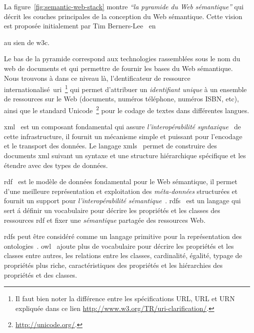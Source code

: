 La figure~\ref{fig:semantic-web-stack} montre \emph{``la pyramide du
  Web sémantique''} qui décrit les couches principales de la
conception du Web sémantique. Cette vision est proposée initialement
par Tim Berners-Lee~\cite{berners2000xml} en \date{2000} au sien de
\acrshort{w3c}.\medskip

Le bas de la pyramide correspond aux technologies rassemblées sous le
nom du web de documents et qui permettre de fournir les bases du Web
sémantique. Nous trouvons à dans ce niveau là, l'dentificateur de
ressource internationalisé~\acrshort{uri}~\footnote{Il faut bien noter
  la différence entre les spécifications URL, URL et URN expliquée
  dans ce lien \url{http://www.w3.org/TR/uri-clarification/}.} qui
permet d'attribuer un \emph{identifiant unique} à un ensemble de
ressources sur le Web (documents, numéros téléphone, numéros ISBN,
etc), ainsi que le standard
\textsf{Unicode}~\footnote{\url{http://unicode.org/}.}  pour le codage
de textes dans différentes langues.\medskip

\acrshort{xml}~\cite{bray1998extensible} est un composant fondamental
qui assure \emph{l'interopérabilité
  syntaxique}~\cite{decker2000semantic} de cette infrastructure, il
fournit un mécanisme simple et puissant pour l'encodage et le
transport des données. Le langage
\acrshort{xmls}~\cite{fallside2004xml} permet de construire des
documents \acrshort{xml} suivant un syntaxe et une structure
hiérarchique spécifique et les étendre avec des types de
données.\medskip

\acrshort{rdf}~\cite{lassila1999resource} est le modèle de données
fondamental pour le Web sémantique, il permet d'une meilleure
représentation et exploitation des \emph{méta-données} structurées et
fournit un support pour \emph{l'interopérabilité
  sémantique}~\cite{decker2000semantic}. \acrshort{rdfs}~\cite{brickley2000resource}
est un langage qui sert á définir un vocabulaire pour décrire les
propriétés et les classes des ressources \acrshort{rdf} et fixer une
\emph{sémantique} partagée des ressources Web.\medskip

\acrshort{rdfs} peut être considéré comme un langage primitive pour la
représentation des
ontologies~\cite{antoniou2012semantic}. \acrshort{owl}~\cite{martin2004owl}
ajoute plus de vocabulaire pour décrire les propriétés et les classes
entre autres, les relations entre les classes, cardinalité, égalité,
typage de propriétés plus riche, caractéristiques des propriétés et
les hiérarchies des propriétés et des classes.\medskip

